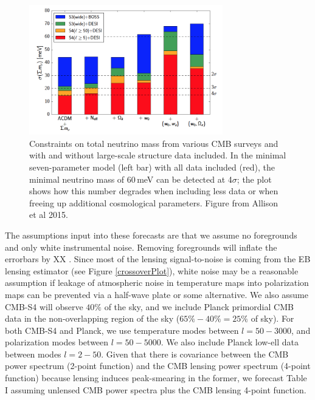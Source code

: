 \begin{figure}[htbp]
\centering
\includegraphics[width=0.75\textwidth]{CMBLensing/Allisonetal.png}
\caption{Constraints on total neutrino mass from various CMB surveys  and with and without large-scale structure data included.   In the minimal seven-parameter model (left bar) with all data included (red), the minimal neutrino mass of 60\,meV can be detected at 4$\sigma$; the plot shows how this number degrades when including less data or when freeing up additional cosmological parameters. Figure from Allison et al 2015.} 
\label{nuForecasts}
\end{figure}



The assumptions input into these forecasts are that we assume no foregrounds and only white instrumental noise.  Removing foregrounds will inflate the errorbars by XX .  Since most of the lensing signal-to-noise is coming from the EB lensing estimator (see Figure \ref{crossoverPlot}), white noise may be a reasonable assumption if leakage of atmospheric noise in temperature maps into polarization maps can be prevented via a half-wave plate or some alternative.  We also assume CMB-S4 will observe $40\%$ of the sky, and we include Planck primordial CMB data in the non-overlapping region of the sky ($65\% - 40\% = 25\%$ of sky).  For both CMB-S4 and Planck, we use temperature modes between $l=50-3000$, and polarization modes between $l=50-5000$.  We also include Planck low-ell data between modes $l=2-50$.  Given that there is covariance between the CMB power spectrum (2-point function) and the CMB lensing power spectrum (4-point function) because lensing induces peak-smearing in the former, we forecast Table I assuming unlensed CMB power spectra plus the CMB lensing 4-point function.    

